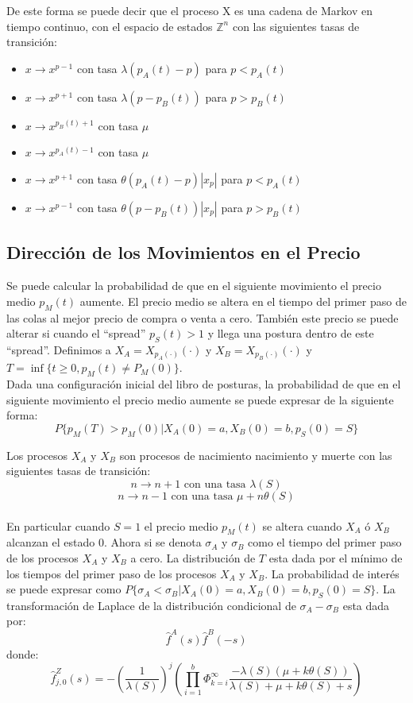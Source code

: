 \documentclass[11pt]{article}
\numberwithin{equation}{section} %
\begin{document}
De este forma se puede decir que el proceso X es una cadena de Markov en tiempo continuo, con el espacio de estados $\mathbb{Z}^n$ con las siguientes tasas de transición:
\begin{itemize}
\item $x\rightarrow x^{p-1}$ con tasa $\lambda(p_A(t)-p)$ para $p<p_A(t)$
\item $x\rightarrow x^{p+1}$ con tasa $\lambda(p-p_B(t))$ para $p>p_B(t)$
\item $x\rightarrow x^{p_B(t)+1}$ con tasa $\mu$
\item $x\rightarrow x^{p_A(t)-1}$ con tasa $\mu$
\item $x\rightarrow x^{p+1}$ con tasa $\theta(p_A(t)-p)|x_p|$ para $p<p_A(t)$
\item $x\rightarrow x^{p-1}$ con tasa $\theta(p-p_B(t))|x_p|$ para $p>p_B(t)$
\end{itemize}

\subsection{Dirección de los Movimientos en el Precio}

Se puede calcular la probabilidad de que en el siguiente movimiento el precio medio $p_M(t)$ aumente. El precio medio se altera en el tiempo del primer paso de las colas al mejor precio de compra o venta a cero. También este precio se puede alterar si cuando el ``spread'' $p_S(t)>1$ y llega una postura dentro de este ``spread''. Definimos a $X_A=X_{p_A(\cdot)}(\cdot)$ y $X_B=X_{p_B(\cdot)}(\cdot)$ y $T=\inf\{t\geq 0, p_M(t) \neq P_M(0)\}$.\\

Dada una configuración inicial del libro de posturas, la probabilidad de que en el siguiente movimiento el precio medio aumente se puede expresar de la siguiente forma:
\[
P\{p_M(T)>p_M(0)|X_A(0)=a,X_B(0)=b,p_S(0)=S\}
\]

Los procesos $X_A$ y $X_B$ son procesos de nacimiento nacimiento y muerte con las siguientes tasas de transición:
\[
n\rightarrow n+1 \text{ con una tasa }\lambda(S)
\]
\[
n\rightarrow n-1 \text{ con una tasa }\mu+n\theta(S)
\]\\

En particular cuando $S=1$ el precio medio $p_M(t)$ se altera cuando $X_A$ ó $X_B$ alcanzan el estado 0. Ahora si se denota $\sigma_A$ y $\sigma_B$ como el tiempo del primer paso de los procesos $X_A$ y $X_B$ a cero.  La distribución de $T$ esta dada por el mínimo de los tiempos del primer paso de los procesos $X_A$ y $X_B$. La probabilidad de interés se puede expresar como $P\{\sigma_A<\sigma_B|X_A(0)=a,X_B(0)=b,p_S(0)=S\}$. La transformación de Laplace de la distribución condicional de $\sigma_A-\sigma_B$ esta dada por:
\[
\hat{f}^A(s)\hat{f}^B(-s)
\]
donde:
\[
\hat{f}_{j,0}^Z(s)=-\left(\frac{1}{\lambda(S)}\right)^j\left( \prod_{i=1}^b \Phi_{k=i}^\infty \frac{-\lambda(S)(\mu+k\theta(S))}{\lambda(S)+\mu+k\theta(S)+s} \right)
\]\\
\end{document}
